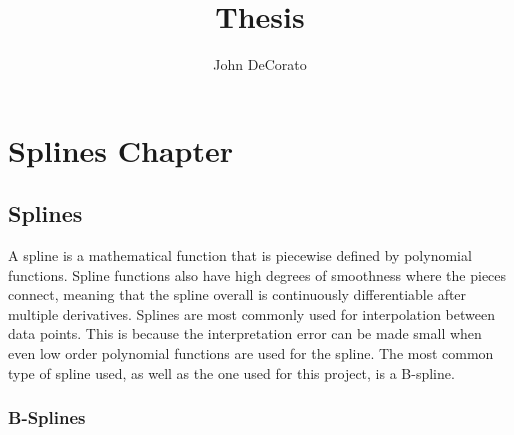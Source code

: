 \documentclass[12pt]{report}
\title{Thesis}
\author{John DeCorato}
\date{ }
\begin{document}
\chapter{Splines Chapter}

\section{Splines}
A spline is a mathematical function that is piecewise defined by polynomial functions. 
Spline functions also have high degrees of smoothness where the pieces connect, meaning that the spline overall is continuously differentiable after multiple derivatives.
Splines are most commonly used for interpolation between data points.
This is because the interpretation error can be made small when even low order polynomial functions are used for the spline.
The most common type of spline used, as well as the one used for this project, is a B-spline.

\subsection{B-Splines}
\end{document}
